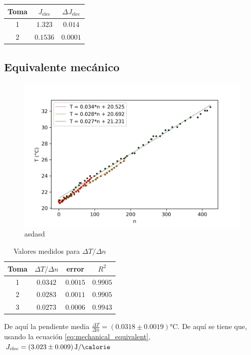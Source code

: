 \begin{table}[h]
    \centering
    \begin{tabular}{ccc}
        \toprule
        Toma & $J_{\text{elec}}$ & $\Delta J_{\text{elec}}$ \\
        \midrule
        1 & $1.323$& $0.014$\\
        2 & $0.1536$ & $0.0001$ \\
        \bottomrule
    \end{tabular}
    \label{tab:elec_equiv}        
\end{table}

\subsection{Equivalente mecánico}

\begin{figure}[H]
    \centering
    \includegraphics[width = .8\linewidth]{img/T_vs_N.png}
    \captionsetup{width=.6\linewidth}
    \caption[Temperatura como función del número de vueltas]{asdasd}
    \label{fig:T_vs_N_mec}
\end{figure}

\begin{table}[h]
    \centering\begin{tabular}{cccc}
        \toprule
        Toma & $\Delta T/\Delta n$ & error & $R^2$ \\
        \midrule
        1 & $0.0342$ & $0.0015$ & $0.9905$ \\
        2 & $0.0283$ & $0.0011$ & $0.9905$ \\
        3 & $0.0273$ & $0.0006$ & $0.9943$ \\
        \bottomrule
        \end{tabular}
    \caption{Valores medidos para $\Delta T/\Delta n$}
    \label{tab:T_vs_N}
\end{table}

De aquí la pendiente media $\frac{\Delta T}{\Delta n} = (0.0318 \pm 0.0019) \si{\celsius}$. De aquí se tiene que, usando la ecuación \eqref{eq:mechanical_equivalent}, $J_{\text{elec}} = (3.023 \pm 0.009)\,\si{\joule\per\calorie}$

